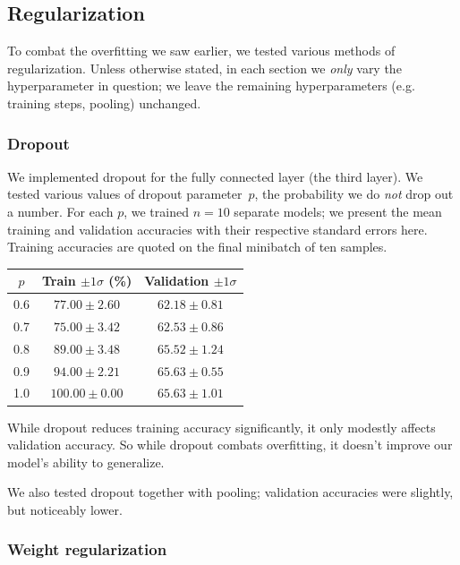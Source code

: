 \documentclass{article}
\begin{document}
\begin{multicols}{2}
\subsection{Regularization}

To combat the overfitting we saw earlier,
we tested various methods of regularization.
Unless otherwise stated,
in each section we \emph{only} vary the hyperparameter in question;
we leave the remaining hyperparameters (e.g. training steps, pooling) unchanged.


\subsubsection{Dropout}


We implemented dropout for the fully connected layer (the third layer).
We tested various values of dropout parameter~$p$,
the probability we do \emph{not} drop out a number.
For each $p$, we trained $n=10$ separate models;
we present the mean training and validation accuracies
with their respective standard errors here.
Training accuracies are quoted on the final minibatch of ten samples.
\begin{center}
    \begin{tabular}{c|cc}
        $p$ & Train $\pm 1 \sigma$ (\%) & Validation $\pm 1 \sigma$\\\hline
        0.6 &  $77.00 \pm 2.60$ & $62.18 \pm 0.81$ \\
        0.7 &  $75.00 \pm 3.42$ & $62.53 \pm 0.86$ \\
        0.8 &  $89.00 \pm 3.48$ & $65.52 \pm 1.24$ \\
        0.9 &  $94.00 \pm 2.21$ & $65.63 \pm 0.55$ \\
        1.0 & $100.00 \pm 0.00$ & $65.63 \pm 1.01$ \\
    \end{tabular}
\end{center}

While dropout reduces training accuracy significantly,
it only modestly affects validation accuracy.
So while dropout combats overfitting,
it doesn't improve our model's ability to generalize.

We also tested dropout together with pooling;
validation accuracies were slightly, but noticeably lower.


\subsubsection{Weight regularization}


\end{multicols}
\end{document}
